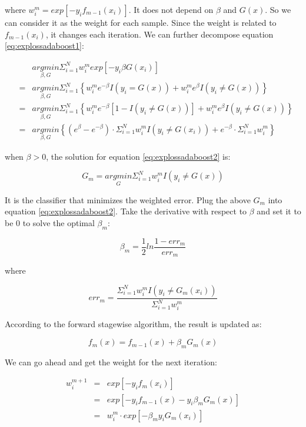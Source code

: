 \documentclass[12pt,]{krantz}
\begin{document}
where \(w_i^m= exp[-y_if_{m-1}(x_i)]\). It does not depend on \(\beta\) and \(G(x)\). So we can consider it as the weight for each sample. Since the weight is related to \(f_{m-1}(x_i)\), it changes each iteration. We can further decompose equation \eqref{eq:explossadaboost1}:

\begin{equation}
\begin{array}{ccc}
 &  & \underset{\beta,G}{argmin}\Sigma_{i=1}^{N}w_{i}^{m}exp[-y_{i}\beta G(x_{i})]\\
 & = & \underset{\beta,G}{argmin}\Sigma_{i=1}^{N}\left\{ w_{i}^{m}e^{-\beta}I(y_{i}=G(x))+w_{i}^{m}e^{\beta}I(y_{i}\neq G(x))\right\} \\
 & = & \underset{\beta,G}{argmin}\Sigma_{i=1}^{N}\left\{ w_{i}^{m}e^{-\beta}[1-I(y_{i}\neq G(x))]+w_{i}^{m}e^{\beta}I(y_{i}\neq G(x))\right\} \\
 & = & \underset{\beta,G}{argmin}\left\{ (e^{\beta}-e^{-\beta})\cdot\Sigma_{i=1}^{N}w_{i}^{m}I(y_{i}\neq G(x_{i}))+e^{-\beta}\cdot\Sigma_{i=1}^{N}w_{i}^{m}\right\} 
\end{array}
\label{eq:explossadaboost2}
\end{equation}

when \(\beta >0\), the solution for equation \eqref{eq:explossadaboost2} is:

\[G_{m} = \underset{G}{argmin}\Sigma_{i=1}^{N}w_{i}^{m}I(y_{i}\neq G(x))\]

It is the classifier that minimizes the weighted error. Plug the above \(G_m\) into equation \eqref{eq:explossadaboost2}. Take the derivative with respect to \(\beta\) and set it to be 0 to solve the optimal \(\beta_m\):

\[\beta_m =\frac{1}{2}ln\frac{1-err_m}{err_m}\]

where

\[err_m = \frac{\Sigma_{i=1}^N w_i^{m}I(y_i \neq G_m(x_i))}{\Sigma_{i=1}^N w_i^{m}}\]

According to the forward stagewise algorithm, the result is updated as:

\[f_m(x)=f_{m-1}(x)+\beta_m G_m(x)\]

We can go ahead and get the weight for the next iteration:

\begin{equation}
\begin{array}{ccc}
w_i^{m+1} & = & exp[-y_if_m (x_i)]\\
& = & exp[-y_if_{m-1}(x)-y_i \beta_m G_m(x)]\\
& = & w_{i}^{m}\cdot exp[-\beta_m y_i G_m(x_i)]
\end{array}
\label{eq:explossadaboost3}
\end{equation}
\end{document}
